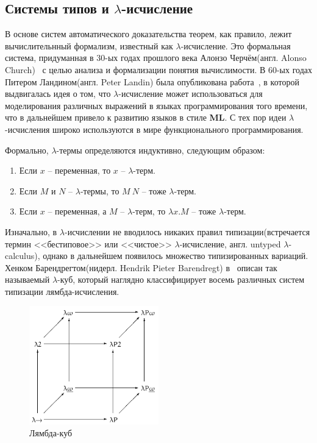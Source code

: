 \subsection{Системы типов и \texorpdfstring{$\lambda$}{лямбда}-исчисление}

В основе систем автоматического доказательства теорем, как правило, лежит вычислительнный формализм, известный как $\lambda$-исчисление. Это формальная система, придуманная в 30-ых годах прошлого века Алонзо Черчём(англ. Alonso Church)~\cite{church1936unsolvable} с целью анализа и формализации понятия вычислимости. В 60-ых годах Питером Ландином(англ. Peter Landin) была опубликована работа~\cite{landin1964mechanical}, в которой выдвигалась идея о том, что $\lambda$-исчисление может использоваться для моделирования различных выражений в языках программирования того времени, что в дальнейшем привело к развитию языков в стиле \textbf{ML}. С тех пор идеи $\lambda$-исчисления широко используются в мире функционального программирования.

Формально, $\lambda$-термы определяются индуктивно, следующим образом:

\begin{enumerate}
  \item Если $x$ -- переменная, то $x$ -- $\lambda$-терм.
  \item Если $M$ и $N$ -- $\lambda$-термы, то $M\ N$ -- тоже $\lambda$-терм.
  \item Если $x$ -- переменная, а $M$ -- $\lambda$-терм, то $\lambda x.M$ -- тоже $\lambda$-терм.
\end{enumerate}

Изначально, в $\lambda$-исчислении не вводилось никаких правил типизации(встречается термин <<бестиповое>> или <<чистое>> $\lambda$-исчисление, англ. untyped $\lambda$-calculus), однако в дальнейшем появилось множество типизированных вариаций. Хенком Барендрегтом(нидерл. Hendrik Pieter Barendregt) в~\cite{barendregt1993lambda} описан так называемый $\lambda$-куб, который наглядно классифицирует восемь различных систем типизации лямбда-исчисления.

\begin{figure}[H]
  \centering
  \includegraphics[width=0.5\textwidth]{img/Lambda_cube.png}
  \caption{Лямбда-куб}
\end{figure}

